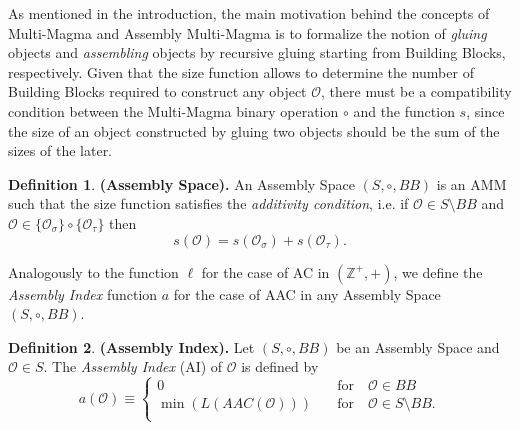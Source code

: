 \documentclass[letterpaper,12pt]{article}
\theoremstyle{definition}
\newtheorem{definition}{Definition}
\begin{document}
As mentioned in the introduction, the main motivation behind the concepts of Multi-Magma and Assembly Multi-Magma is to formalize the notion of \textit{gluing} objects and \textit{assembling} objects by recursive gluing starting from Building Blocks, respectively. Given that the size function allows to determine the number of Building Blocks required to construct any object $\mathscr{O}$, there must be a compatibility condition between the Multi-Magma binary operation $\circ$ and the function $s$, since the size of an object constructed by gluing two objects should be the sum of the sizes of the later.            
\begin{definition} \textbf{(Assembly Space).} An Assembly Space $(S,\circ,BB)$ is an AMM such that the size function satisfies the \textit{additivity condition}, i.e. if $\mathscr{O} \in S \setminus BB$ and $\mathscr{O} \in \{\mathscr{O}_\sigma\} \circ \{\mathscr{O}_\tau \}$ then 
\begin{equation}\label{sizeprop}
    s(\mathscr{O})= s(\mathscr{O}_\sigma)+s(\mathscr{O}_\tau).
\end{equation}
\end{definition} 
Analogously to the function $\ell$ for the case of AC in $(\mathbb{Z}^+,+)$, we define the \textit{Assembly Index} function $a$ for the case of AAC in any Assembly Space $(S,\circ,BB)$. 
\begin{definition}\label{AI} \textbf{(Assembly Index).} Let $(S,\circ,BB)$ be an Assembly Space and $\mathscr{O} \in S$. The \textit{Assembly Index} (AI) of $\mathscr{O}$ is defined by  
    \begin{equation}\label{AI}
        a(\mathscr{O}) \equiv \begin{cases}
        0 \qquad & \text{for} \quad \mathscr{O} \in BB \\
        \min (L(AAC(\mathscr{O}))) \quad & \text{for} \quad \mathscr{O} \in S \setminus BB. \\
        \end{cases}      
    \end{equation}
\end{definition}
\end{document}
